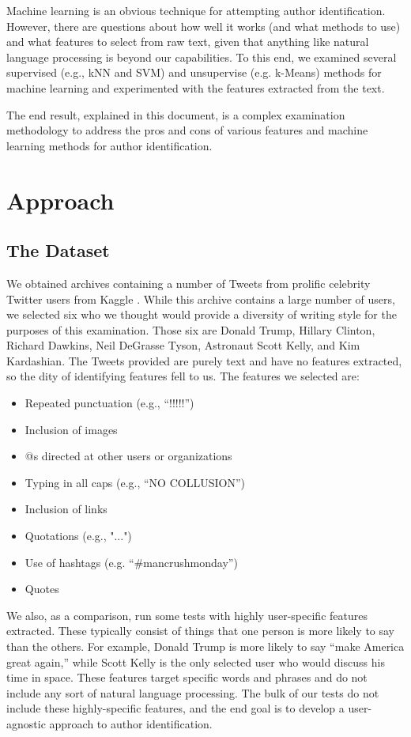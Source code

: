 \documentclass[letter,11pt,titlepage]{article}
\begin{document}
Machine learning is an obvious technique for attempting author identification. However, there are questions about how well it works (and what methods to use) and what features to select from raw text, given that anything like natural language processing is beyond our capabilities. To this end, we examined several supervised (e.g., kNN and SVM) and unsupervise (e.g. k-Means) methods for machine learning and experimented with the features extracted from the text.

The end result, explained in this document, is a complex examination methodology to address the pros and cons of various features and machine learning methods for author identification.

\section{Approach}

\subsection{The Dataset}

We obtained archives containing a number of Tweets from prolific celebrity Twitter users from Kaggle \cite{TweetSource}. While this archive contains a large number of users, we selected six who we thought would provide a diversity of writing style for the purposes of this examination. Those six are Donald Trump, Hillary Clinton, Richard Dawkins, Neil DeGrasse Tyson, Astronaut Scott Kelly, and Kim Kardashian. The Tweets provided are purely text and have no features extracted, so the dity of identifying features fell to us. The features we selected are:

\begin{itemize}
    \item Repeated punctuation (e.g., ``!!!!!'')
    \item Inclusion of images
    \item @s directed at other users or organizations
    \item Typing in all caps (e.g., ``NO COLLUSION'')
    \item Inclusion of links
    \item Quotations (e.g., "...")
    \item Use of hashtags (e.g. ``\#mancrushmonday'')
    \item Quotes
\end{itemize}

We also, as a comparison, run some tests with highly user-specific features extracted. These typically consist of things that one person is more likely to say than the others. For example, Donald Trump is more likely to say ``make America great again,'' while Scott Kelly is the only selected user who would discuss his time in space. These features target specific words and phrases and do not include any sort of natural language processing. The bulk of our tests do not include these highly-specific features, and the end goal is to develop a user-agnostic approach to author identification.
\end{document}
